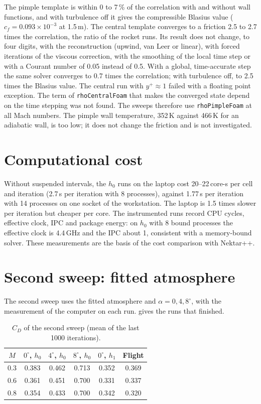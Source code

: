 \documentclass[11pt,a4paper]{article}
\newcommand{\unit}[2]{#1\,#2}
\begin{document}
The pimple template is within 0 to 7\,\% of the correlation with and without wall
functions, and with turbulence off it gives the compressible Blasius value
($c_f = 0.093 \times 10^{-3}$ at \unit{1.5}{m}). The central template converges to a
friction 2.5 to 2.7 times the correlation, the ratio of the rocket runs. Its result does
not change, to four digits, with the reconstruction (upwind, van Leer or linear), with
forced iterations of the viscous correction, with the smoothing of the local time step
or with a Courant number of 0.05 instead of 0.5. With a global, time-accurate step the
same solver converges to 0.7 times the correlation; with turbulence off, to 2.5 times
the Blasius value. The central run with $y^+ \approx 1$ failed with a floating point
exception. The term of \texttt{rhoCentralFoam} that makes the converged state depend on
the time stepping was not found. The sweeps therefore use \texttt{rhoPimpleFoam} at all
Mach numbers. The pimple wall temperature, \unit{352}{K} against \unit{466}{K} for an
adiabatic wall, is too low; it does not change the friction and is not investigated.

\section{Computational cost}

Without suspended intervals, the $h_0$ runs on the laptop cost 20--22\,core-\textmu s
per cell and iteration (\unit{2.7}{s} per iteration with 8 processes), against
\unit{1.77}{s} per iteration with 14 processes on one socket of the workstation. The
laptop is 1.5 times slower per iteration but cheaper per core. The instrumented runs
record CPU cycles, effective clock, IPC and package energy: on $h_0$ with 8 bound
processes the effective clock is \unit{4.4}{GHz} and the IPC about 1, consistent with a
memory-bound solver. These measurements are the basis of the cost comparison with
Nektar++.

\section{Second sweep: fitted atmosphere}\label{sec:sweep2}

The second sweep uses the fitted atmosphere and $\alpha = 0, 4, 8^\circ$, with the
measurement of the computer on each run.  gives the runs that
finished.

\begin{table}[htbp]
\centering
\caption{$C_D$ of the second sweep (mean of the last 1000 iterations).}\label{tab:sweep2}
\begin{tabular}{@{}c ccc c c@{}}
\toprule
$M$ & $0^\circ$, $h_0$ & $4^\circ$, $h_0$ & $8^\circ$, $h_0$ & $0^\circ$, $h_1$ & Flight \\
\midrule
0.3 & 0.383 & 0.462 & 0.713 & 0.352 & 0.369 \\
0.6 & 0.361 & 0.451 & 0.700 & 0.331 & 0.337 \\
0.8 & 0.354 & 0.433 & 0.700 & 0.342 & 0.320 \\
\bottomrule
\end{tabular}
\end{table}
\end{document}
